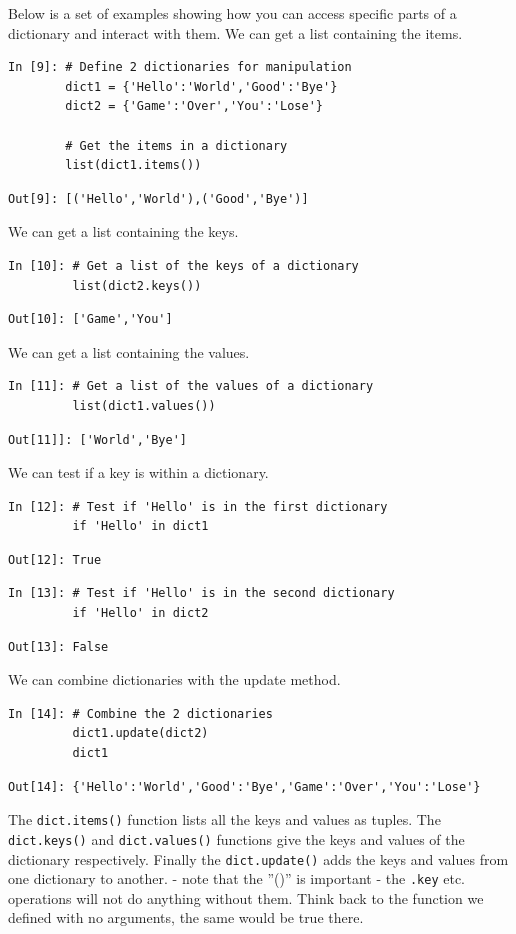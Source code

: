 Below is a set of examples showing how you can access specific parts of a dictionary and interact with them.
We can get a list containing the items.
\begin{lstlisting}[style=PY]
In [9]: # Define 2 dictionaries for manipulation
        dict1 = {'Hello':'World','Good':'Bye'}
        dict2 = {'Game':'Over','You':'Lose'}
        
        # Get the items in a dictionary
        list(dict1.items())
\end{lstlisting}
\begin{lstlisting}[style=PY_out]
Out[9]: [('Hello','World'),('Good','Bye')]
\end{lstlisting}
We can get a list containing the keys.
\begin{lstlisting}[style=PY]
In [10]: # Get a list of the keys of a dictionary
         list(dict2.keys())
\end{lstlisting}
\begin{lstlisting}[style=PY_out]
Out[10]: ['Game','You']
\end{lstlisting}
We can get a list containing the values.
\begin{lstlisting}[style=PY]
In [11]: # Get a list of the values of a dictionary
         list(dict1.values())
\end{lstlisting}
\begin{lstlisting}[style=PY_out]
Out[11]]: ['World','Bye']
\end{lstlisting}
We can test if a key is within a dictionary.
\begin{lstlisting}[style=PY]
In [12]: # Test if 'Hello' is in the first dictionary
         if 'Hello' in dict1
\end{lstlisting}
\begin{lstlisting}[style=PY_out]
Out[12]: True
\end{lstlisting}
\begin{lstlisting}[style=PY]
In [13]: # Test if 'Hello' is in the second dictionary
         if 'Hello' in dict2
\end{lstlisting}
\begin{lstlisting}[style=PY_out]
Out[13]: False
\end{lstlisting}
We can combine dictionaries with the update method.
\begin{lstlisting}[style=PY]
In [14]: # Combine the 2 dictionaries
         dict1.update(dict2)
         dict1
\end{lstlisting}
\begin{lstlisting}[style=PY_out]
Out[14]: {'Hello':'World','Good':'Bye','Game':'Over','You':'Lose'}
\end{lstlisting}
The \texttt{dict.items()} function lists all the keys and values as tuples. The \texttt{dict.keys()} and \texttt{dict.values()} functions give the keys and values of the dictionary respectively. Finally the \texttt{dict.update()} adds the keys and values from one dictionary to another. - note that the ''()'' is important - the {\tt .key} etc. operations will not do anything without them. Think back to the function we defined with no arguments, the same would be true there. \\


